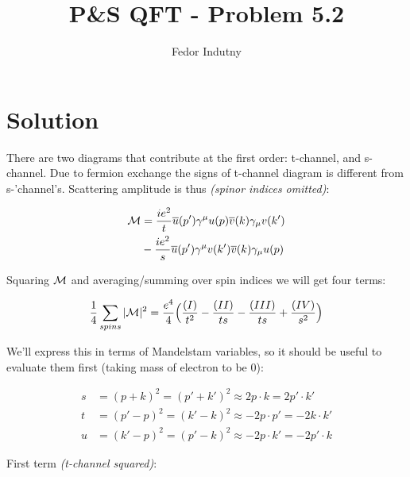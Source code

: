 \documentclass[11pt]{article}
\title{P\&S QFT - Problem 5.2}
\author{Fedor Indutny}
\begin{document}
\maketitle

\section{Solution}

There are two diagrams that contribute at the first order: t-channel, and s-channel.
Due to fermion exchange the signs of t-channel diagram is different from s-'channel's.
Scattering amplitude is thus \textit{(spinor indices omitted)}:

\begin{equation}
  \begin{split}
    {\cal{M}} & = \frac{i e^2}{t} \overline{u}(p') \gamma^\mu u(p)
      \overline{v}(k) \gamma_\mu v(k') \\
    & - \frac{i e^2}{s} \overline{u}(p') \gamma^\mu v(k')
      \overline{v}(k) \gamma_\mu u(p)
  \end{split}
\end{equation}

Squaring ${\cal{M}}$ and averaging/summing over spin indices we will get four
terms:

\begin{equation}
  \begin{split}
    \frac{1} {4} \sum_{spins} |{\cal{M}}|^2 =
      \frac{e^4} {4} \Big ( \frac{(I)} {t^2} - \frac{(II)} {ts} -
                                  \frac{(III)} {ts} + \frac{(IV)} {s^2} \Big )
  \end{split}
\end{equation}

We'll express this in terms of Mandelstam variables, so it should be useful to evaluate
them first (taking mass of electron to be $0$):

\begin{equation}
  \begin{split}
    s &= (p + k)^2 = (p' + k')^2 \approx 2 p \cdot k =  2 p' \cdot k'\\
    t &= (p' - p)^2 = (k' - k)^2 \approx -2 p \cdot p' = -2 k \cdot k' \\
    u &= (k' - p)^2 = (p' - k)^2 \approx -2 p \cdot k' = -2 p' \cdot k
  \end{split}
\end{equation}

\pagebreak

First term \textit{(t-channel squared)}:
\end{document}
